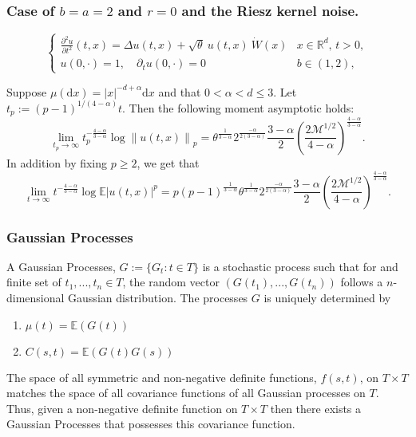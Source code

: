 \documentclass{beamer}%
\numberwithin{equation}{section}
\newcommand{\R}{\mathbb{R}}
\newcommand{\E}{\mathbb{E}}
\newcommand{\Norm}[1]{\left\|  #1   \right\|}
\newcommand{\ud}{\ensuremath{\mathrm{d} }}
\begin{document}
	\begin{frame}[t]
		\frametitle{Case of $b=a=2$ and $r=0$ and the Riesz kernel noise.}

		\begin{equation*}
		\begin{cases}
		\frac{\partial^2 u}{\partial t^2}(t,x) = \Delta u(t,x) + \sqrt{\theta}\: u(t,x)\: \dot W(x) & \text{$x\in \R^d$, $t>0$}, \\

		u(0,\cdot) = 1, \quad \partial_t u(0,\cdot) = 0                                                                            & b \in (1,2),
		\end{cases}
		\end{equation*}

		\begin{theorem}
			Suppose $\mu(\ud x) = |x|^{-d+\alpha} \ud x$ and that $0 < \alpha < d \le 3$. Let $t_p:=(p-1)^{1/(4-\alpha)}t$. Then the following moment asymptotic holds:
			\[
			\lim_{t_p \to \infty} t_p^{-\frac{4-\alpha}{3-\alpha}} \log \Norm{u(t,x)}_p = \theta^{\frac{1}{3-\alpha}} 2^{\frac{-\alpha}{2(3-\alpha)}} \frac{3- \alpha}{2} \left( \frac{2 \mathcal{M}^{1/2}}{4-\alpha} \right)^{\frac{4-\alpha}{3-\alpha}}.
			\]
			In addition by fixing $p\ge 2$, we get that
			\[
			\lim_{t \to \infty} t^{-\frac{4-\alpha}{3-\alpha}} \log \mathbb{E}|u(t,x)|^p =p(p-1)^{\frac{1}{3-\alpha}} \theta^{\frac{1}{3-\alpha}} 2^{\frac{-\alpha}{2(3-\alpha)}} \frac{3- \alpha}{2} \left( \frac{2 \mathcal{M}^{1/2}}{4-\alpha} \right)^{\frac{4-\alpha}{3-\alpha}}.
			\]
		\end{theorem}
	\end{frame}

	\begin{frame}[t]
		\frametitle{Gaussian Processes}

		A Gaussian Processes, $G := \{G_t : t \in T\}$ is a stochastic process such that for and finite set of $t_1,...,t_n \in T$, the random vector $(G(t_1),...,G(t_n))$ follows a $n$-dimensional Gaussian distribution. The processes $G$ is uniquely determined by
		\begin{enumerate}
			\item $\mu(t) = \E(G(t))$
			\item $C(s,t) = \E(G(t)G(s))$
		\end{enumerate}

		\begin{theorem}[Important]
			The space of all symmetric and non-negative definite functions, $f(s,t)$, on $T\times T$ matches the space of all covariance functions of all Gaussian processes on $T$. Thus, given a non-negative definite function on $T \times T$ then there exists a Gaussian Processes that possesses this covariance function.
		\end{theorem}
	\end{frame}
\end{document}
